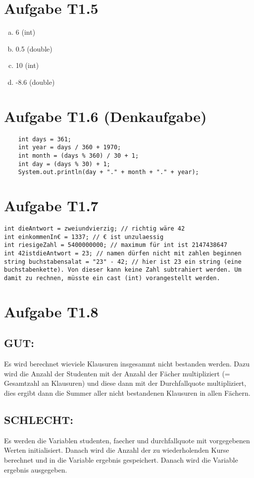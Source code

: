 \documentclass[final,a4paper]{article}
\begin{document}
\section*{Aufgabe T1.5}
\begin{enumerate}[(a)]
\item 6 	(int) 
\item 0.5 	(double)
\item 10 	(int)
\item -8.6 	(double)
\end{enumerate}
\section*{Aufgabe T1.6 (Denkaufgabe)}
\begin{lstlisting}
	int days = 361;
	int year = days / 360 + 1970;
	int month = (days % 360) / 30 + 1;
	int day = (days % 30) + 1;
	System.out.println(day + "." + month + "." + year);
\end{lstlisting}


\section*{Aufgabe T1.7}
\begin{lstlisting}
int dieAntwort = zweiundvierzig; // richtig wäre 42
int einkommenIn€ = 1337; // € ist unzulaessig
int riesigeZahl = 5400000000; // maximum für int ist 2147438647
int 42istdieAntwort = 23; // namen dürfen nicht mit zahlen beginnen
string buchstabensalat = "23" - 42; // hier ist 23 ein string (eine buchstabenkette). Von dieser kann keine Zahl subtrahiert werden. Um damit zu rechnen, müsste ein cast (int) vorangestellt werden.
\end{lstlisting}

\section*{Aufgabe T1.8}
\subsection*{GUT:}
Es wird berechnet wieviele Klausuren insgesammt nicht bestanden werden. Dazu wird die Anzahl der Studenten mit der Anzahl der Fächer multipliziert (= Gesamtzahl an Klausuren) und diese dann mit der Durchfallquote multipliziert, dies ergibt dann die Summer aller nicht bestandenen Klausuren in allen Fächern.

\subsection*{SCHLECHT:}
Es werden die Variablen studenten, faecher und durchfallquote mit vorgegebenen Werten initialisiert. Danach wird die Anzahl der zu wiederholenden Kurse berechnet und in die Variable ergebnis gespeichert. Danach wird die Variable ergebnis ausgegeben.
\end{document}
